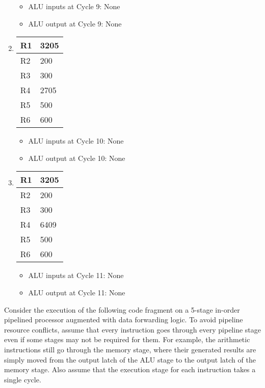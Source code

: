 \documentclass[12pt,letterpaper]{hmcpset}
\begin{document}
\begin{solution}
\begin{enumerate}[label=Cycle \arabic*]
\begin{itemize}
\item ALU inputs at Cycle 9: None
\item ALU output at Cycle 9: None
\end{itemize}

\item

\begin{tabular}{|l|l|}
\hline
R1 & 3205 \\
\hline 
R2 & 200 \\
\hline
R3 & 300 \\
\hline
R4 & 2705 \\
\hline
R5 & 500 \\
\hline
R6 & 600 \\
\hline
\end{tabular}

\begin{itemize}
\item ALU inputs at Cycle 10: None
\item ALU output at Cycle 10: None
\end{itemize}

\item

\begin{tabular}{|l|l|}
\hline
R1 & 3205 \\
\hline 
R2 & 200 \\
\hline
R3 & 300 \\
\hline
R4 & 6409 \\
\hline
R5 & 500 \\
\hline
R6 & 600 \\
\hline
\end{tabular}

\begin{itemize}
\item ALU inputs at Cycle 11: None
\item ALU output at Cycle 11: None
\end{itemize}



\end{enumerate}
\end{solution}

\begin{problem}[2]
Consider the execution of the following code fragment on a 5-stage in-order pipelined processor augmented with data forwarding logic.  To avoid pipeline resource conflicts, assume that every instruction goes through every pipeline stage even if some stages may not be required for them. For example, the arithmetic instructions still go through the memory stage, where their generated results are simply moved from the output latch of the ALU stage to the output latch of the memory stage. Also assume that the execution stage for each instruction takes a single cycle.
\end{problem}
\end{document}
